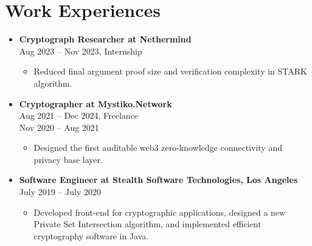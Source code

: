 \documentclass[a4paper,12pt]{article}
\begin{document}
\section*{Work Experiences}
\begin{itemize}[left=0pt, label={}, parsep=0pt]
    \item \textbf{Cryptograph Researcher at Nethermind} \\
    Aug 2023 – Nov 2023, Internship
    \begin{itemize}[left=0pt,label=\textbullet,topsep=0pt]
        \item Reduced final argument proof size and verification complexity in STARK algorithm.
    \end{itemize}
    \item \textbf{Cryptographer at Mystiko.Network} \\
    Aug 2021 – Dec 2024, Freelance\\
    Nov 2020 – Aug 2021
    \begin{itemize}[left=0pt,label=\textbullet,topsep=0pt]
        \item Designed the first auditable web3 zero-knowledge connectivity and privacy base layer.
    \end{itemize}
    \item \textbf{Software Engineer at Stealth Software Technologies, Los Angeles} \\
    July 2019 – July 2020 
    \begin{itemize}[left=0pt,label=\textbullet,topsep=0pt]
        \item Developed front-end for cryptographic applications, designed a new Private Set Intersection algorithm, and implemented efficient cryptography software in Java.
    \end{itemize}
\end{itemize}
\end{document}

